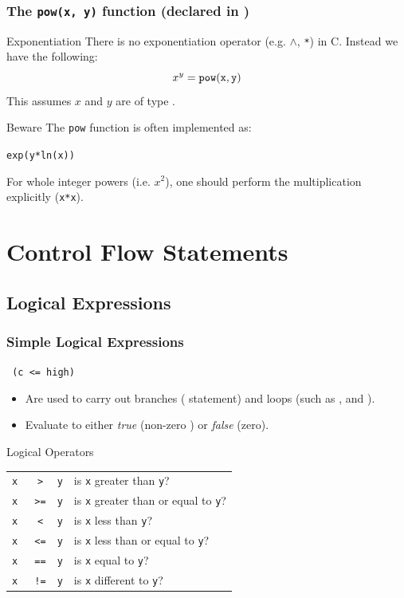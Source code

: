 \documentclass[smaller,handout,table]{beamer}
\begin{document}
\begin{frame}
\frametitle{The {\tt pow(x, y)} function (declared in )}
\begin{block}{Exponentiation}
There is no exponentiation operator (e.g. $\wedge$, {\tt **}) in C. Instead we have the following:
$$x^y = \mathrm{\tt pow(x,y)}$$
This assumes $x$ and $y$ are of type .
\end{block}

\begin{alertblock}{Beware}
The {\tt pow} function is often implemented as:
\begin{center}{\tt exp(y*ln(x))}\end{center}
For whole integer powers (i.e. $x^2$), one should perform the multiplication explicitly ({\tt x*x}).
\end{alertblock}
\end{frame}


\section{Control Flow Statements}
\subsection{Logical Expressions}
\begin{frame}
\frametitle{Simple Logical Expressions}
\texttt{\kl   {} (c <= high)}\\ 
\begin{itemize}
\item Are used to carry out branches ({\tt {}} statement) and loops (such as {\tt {}}, and {\tt {}}).
\item Evaluate to either \emph{true} (non-zero ) or \emph{false} (zero).
\end{itemize}

\begin{block}{Logical Operators}
\begin{center}
\begin{tabular}{l c l l}
\tt x &\tt>&\tt  y& is {\tt x} greater than {\tt y}?\\
\tt x &\tt>=&\tt y& is {\tt x} greater than or equal to {\tt y}?\\
\tt x &\tt<&\tt  y& is {\tt x} less than {\tt y}?\\
\tt x &\tt<=&\tt y& is {\tt x} less than or equal to {\tt y}?\\
\alert{\tt x }&\tt\alert{==}&\alert{\tt y}&\alert{is {\tt x} equal to {\tt y}?}\\
\tt x &\tt!=&\tt y& is {\tt x} different to {\tt y}?
\end{tabular}
\end{center}
\end{block}
\end{frame}
\end{document}
